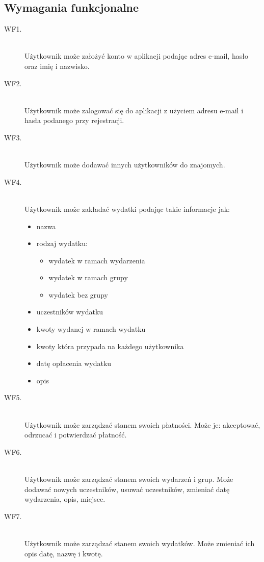 \subsection{Wymagania funkcjonalne}
\begin{description}
  \item[WF1.] \hfill \\ Użytkownik może założyć konto w aplikacji podając adres e-mail, hasło oraz imię i nazwisko.
  \item[WF2.] \hfill \\ Użytkownik może zalogować się do aplikacji z użyciem adresu e-mail i hasła podanego przy rejestracji.
  \item[WF3.] \hfill \\ Użytkownik może dodawać innych użytkowników do znajomych.
  \item[WF4.] \hfill \\ Użytkownik może zakładać wydatki podając takie informacje jak:
    \begin{itemize}
      \item nazwa
      \item rodzaj wydatku:
        \begin{itemize}
          \item wydatek w ramach wydarzenia
          \item wydatek w ramach grupy
          \item wydatek bez grupy
        \end{itemize}
      \item uczestników wydatku
      \item kwoty wydanej w ramach wydatku
      \item kwoty która przypada na każdego użytkownika
      \item datę opłacenia wydatku
      \item opis
    \end{itemize}
  \item[WF5.] \hfill \\ Użytkownik może zarządzać stanem swoich płatności. Może je: akceptować, odrzucać i potwierdzać płatność.
  \item[WF6.] \hfill \\ Użytkownik może zarządzać stanem swoich wydarzeń i grup. Może dodawać nowych uczestników, usuwać uczestników, zmieniać datę wydarzenia, opis, miejsce.
  \item[WF7.] \hfill \\ Użytkownik może zarządzać stanem swoich wydatków. Może zmieniać ich opis datę, nazwę i kwotę.

\end{description}
